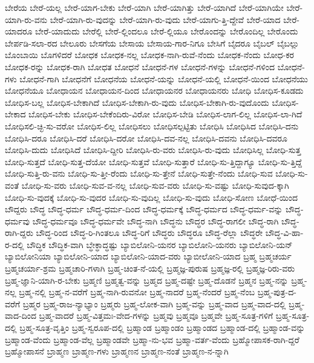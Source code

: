 {ಬೇರೆಯ
ಬೇರೆ-ಯಲ್ಲ
ಬೇರೆ-ಯಾಗ-ಬೇಕು
ಬೇರೆ-ಯಾಗಿ
ಬೇರೆ-ಯಾಗಿತ್ತು
ಬೇರೆ-ಯಾಗಿದೆ
ಬೇರೆ-ಯಾಗಿಯೇ
ಬೇರೆ-ಯಾಗಿ-ರು-ವನು
ಬೇರೆ-ಯಾಗಿ-ರು-ವುದನ್ನು
ಬೇರೆ-ಯಾಗಿ-ರು-ವುದು
ಬೇರೆ-ಯಾಗು-ತ್ತಿ-ದ್ದೇವೆ
ಬೇರೆ-ಯಾದ
ಬೇರೆ-ಯಾದರೂ
ಬೇರೆ-ಯಾದುದು
ಬೇರೆಲ್ಲಿ
ಬೇರೆ-ಲ್ಲಿಂದಲೂ
ಬೇರೆ-ಲ್ಲಿಯೂ
ಬೇರೊಂದನ್ನು
ಬೇರೊಂದಿಲ್ಲ
ಬೇರೊಂದು
ಬೇರ್ಪಡಿ-ಸಲಾ-ರದ
ಬೇಲೂರು
ಬೇಸಗೆಯ
ಬೇಸಾಯ
ಬೇಸಾಯ-ಗಾರ-ನಿಗೂ
ಬೇಸಿಗೆ
ಬೈದರೂ
ಬೈಬಲ್
ಬೈಬಲ್ಲು
ಬೊಂಬಾಯಿ
ಬೊಗಳಿದರೆ
ಬೋಧಕ
ಬೋಧಕ-ನಲ್ಲ
ಬೋಧಕ-ನಾಗಿ-ರುವೆ-ನೆಂದು
ಬೋಧಕ-ನೆಂದು
ಬೋಧ-ಕರ
ಬೋಧಕ-ರನ್ನು
ಬೋಧಕ-ರಾಗಿ
ಬೋಧತ
ಬೋಧನೆ
ಬೋಧನೆ-ಗಳ
ಬೋಧನೆ-ಗಳನ್ನು
ಬೋಧನೆ-ಗಳಿಂದ
ಬೋಧನೆ-ಗಳು
ಬೋಧನೆ-ಗಾಗಿ
ಬೋಧನೆಗೆ
ಬೋಧನೆಯ
ಬೋಧನೆ-ಯನ್ನು
ಬೋಧನೆ-ಯಲ್ಲಿ
ಬೋಧನೆ-ಯಿಂದ
ಬೋಧನೆಯು
ಬೋಧನೆಯೂ
ಬೋಧಾಯನ
ಬೋಧಾಯನ-ದಿಂದ
ಬೋಧಾಯನರ
ಬೋಧಾಯನರು
ಬೋಧಿ
ಬೋಧಿಸ-ಕೂಡದು
ಬೋಧಿಸ-ಬಲ್ಲ
ಬೋಧಿಸ-ಬೇಕಾಗಿದೆ
ಬೋಧಿಸ-ಬೇಕಾಗಿ-ರು-ವುದು
ಬೋಧಿಸ-ಬೇಕಾಗಿ-ರು-ವುದೊಂದು
ಬೋಧಿಸ-ಬೇಕಾದ
ಬೋಧಿಸ-ಬೇಕು
ಬೋಧಿಸ-ಬೇಕೆಂದಿರು-ವಿರೋ
ಬೋಧಿಸ-ಬೇಡಿ
ಬೋಧಿಸ-ಲಾಗ-ಲಿಲ್ಲ
ಬೋಧಿಸ-ಲಾ-ಗಿದೆ
ಬೋಧಿಸಲಿ-ಚ್ಛಿ-ಸು-ವರೋ
ಬೋಧಿಸ-ಲಿಲ್ಲ
ಬೋಧಿಸಲು
ಬೋಧಿಸಲ್ಪಟ್ಟಿತು
ಬೋಧಿಸಿ
ಬೋಧಿಸಿದ
ಬೋಧಿಸಿ-ದನು
ಬೋಧಿಸಿ-ದರೂ
ಬೋಧಿಸಿ-ದರೆ
ಬೋಧಿಸಿ-ದರೋ
ಬೋಧಿಸಿ-ದವ-ನಲ್ಲ
ಬೋಧಿಸಿ-ದವನು
ಬೋಧಿಸಿ-ದವರೂ
ಬೋಧಿಸಿ-ದುದು
ಬೋಧಿಸಿದೆ
ಬೋಧಿಸಿ-ದ್ದೀರಿ
ಬೋಧಿಸಿ-ರು-ವರು
ಬೋಧಿಸಿ-ರು-ವುದು
ಬೋಧಿಸಿಲ್ಲ
ಬೋಧಿ-ಸುತ್ತ
ಬೋಧಿ-ಸುತ್ತದೆ
ಬೋಧಿ-ಸುತ್ತ-ದೆಯೋ
ಬೋಧಿ-ಸುತ್ತವೆ
ಬೋಧಿ-ಸುತ್ತಾರೆ
ಬೋಧಿ-ಸು-ತ್ತಿದ್ದಾಗ್ಯೂ
ಬೋಧಿ-ಸು-ತ್ತಿದ್ದೆ
ಬೋಧಿ-ಸುತ್ತಿ-ರು-ವನು
ಬೋಧಿ-ಸು-ತ್ತೀ-ರೆಂದು
ಬೋಧಿ-ಸು-ತ್ತೇನೆ
ಬೋಧಿ-ಸುತ್ತೇ-ನೆಂದು
ಬೋಧಿ-ಸುವ
ಬೋಧಿ-ಸು-ವಂತೆ
ಬೋಧಿ-ಸು-ವರು
ಬೋಧಿ-ಸುವ-ವ-ನಲ್ಲ
ಬೋಧಿ-ಸುವ-ವರು
ಬೋಧಿ-ಸು-ವಷ್ಟು
ಬೋಧಿ-ಸುವುದ-ಕ್ಕಾಗಿ
ಬೋಧಿ-ಸು-ವುದಕ್ಕೆ
ಬೋಧಿ-ಸು-ವುದರ
ಬೋಧಿ-ಸು-ವುದಿಲ್ಲ
ಬೋಧಿ-ಸು-ವುದು
ಬೋಧಿ-ಸೋಣ
ಬೋಧೆ-ಯಿಂದ
ಬೌದ್ದರು
ಬೌದ್ಧ
ಬೌದ್ಧ-ಧರ್ಮ
ಬೌದ್ಧ-ಧರ್ಮ-ದಿಂದ
ಬೌದ್ಧ-ಧರ್ಮಕ್ಕೆ
ಬೌದ್ಧ-ಧರ್ಮದ
ಬೌದ್ಧ-ಧರ್ಮ-ವನ್ನು
ಬೌದ್ಧ-ಧರ್ಮವು
ಬೌದ್ಧ-ಧರ್ಮವೂ
ಬೌದ್ಧ-ಧರ್ಮವೇ
ಬೌದ್ಧ-ನಾಗಿ
ಬೌದ್ಧನು
ಬೌದ್ಧರ
ಬೌದ್ಧ-ರಾಗಲೀ
ಬೌದ್ಧ-ರಾಗಿ
ಬೌದ್ಧ-ರಾಗಿ-ದ್ದರು
ಬೌದ್ಧ-ರಿಂದ
ಬೌದ್ಧ-ರಿ-ಗಿಂತಲೂ
ಬೌದ್ಧ-ರಿಗೆ
ಬೌದ್ಧರು
ಬೌದ್ಧರೂ
ಬೌದ್ಧ-ರೆಲ್ಲಾ
ಬೌದ್ಧರೇ
ಬೌದ್ಧ-ವಿ-ಹಾ-ರ-ದಲ್ಲಿ
ಬೌದ್ಧಿಕ
ಬೌದ್ಧಿಕ-ವಾಗಿ
ಬ್ಧೇಕ್ಧಾದ್ಧಷ್ಟು
ಬ್ಯಾಬಿಲೋನಿ-ಯನರ
ಬ್ಯಾಬಿಲೋನಿ-ಯನರು
ಬ್ಯಾಬಿಲೋನಿ-ಯನ್
ಬ್ಯಾಬಿಲೋನಿಯಾ
ಬ್ಯಾಬಿಲೋನಿ-ಯಾದ
ಬ್ಯಾಬಿಲೋನಿ-ಯಾದ-ವರು
ಬ್ಯಾಬೀಲೋನಿ-ಯಾದ
ಬ್ರಹ್ಮ
ಬ್ರಹ್ಮಚರ್ಯ
ಬ್ರಹ್ಮಚರ್ಯಾ-ಶ್ರಮ
ಬ್ರಹ್ಮಚಾರಿ-ಗಳಾಗಿ
ಬ್ರಹ್ಮ-ಚಿಂತ-ನೆ-ಯಲ್ಲಿ
ಬ್ರಹ್ಮಜ್ಞ-ಪುರುಷ
ಬ್ರಹ್ಮಜ್ಞ-ರಲ್ಲಿ
ಬ್ರಹ್ಮಜ್ಞ-ರಿರು-ವರು
ಬ್ರಹ್ಮ-ಜ್ಞಾನಿ-ಯಾಗಿ-ರ-ಬೇಕು
ಬ್ರಹ್ಮಣಿ
ಬ್ರಹ್ಮತ್ವ-ವನ್ನು
ಬ್ರಹ್ಮದ
ಬ್ರಹ್ಮ-ದಷ್ಟೇ
ಬ್ರಹ್ಮ-ದೊಡನೆ
ಬ್ರಹ್ಮನ
ಬ್ರಹ್ಮ-ನನ್ನು
ಬ್ರಹ್ಮ-ನಲ್ಲ
ಬ್ರಹ್ಮ-ನಲ್ಲಿ
ಬ್ರಹ್ಮ-ನ-ವರೆಗೆ
ಬ್ರಹ್ಮ-ನಾಗಿ-ರುವನೋ
ಬ್ರಹ್ಮ-ನಾದರೆ
ಬ್ರಹ್ಮ-ನೆಂದರೆ
ಬ್ರಹ್ಮ-ನೆಂಬ
ಬ್ರಹ್ಮ-ಪುತ್ರ-ದ-ವರೆಗೆ
ಬ್ರಹ್ಮರ
ಬ್ರಹ್ಮ-ರಾಜ-ನ್ಯಾಭ್ಯಾಂ
ಬ್ರಹ್ಮರು
ಬ್ರಹ್ಮ-ಲೋಕ-ವಾಗಿ
ಬ್ರಹ್ಮ-ವನ್ನು
ಬ್ರಹ್ಮ-ವಾದ
ಬ್ರಹ್ಮ-ವಾದ-ದಲ್ಲಿ
ಬ್ರಹ್ಮ-ವಾದ-ದಿಂದ
ಬ್ರಹ್ಮ-ವಾದರೆ
ಬ್ರಹ್ಮ-ವಿತ್ತಮಃ-ವೇದ-ಗಳನ್ನು
ಬ್ರಹ್ಮವು
ಬ್ರಹ್ಮವೂ
ಬ್ರಹ್ಮವೇ
ಬ್ರಹ್ಮ-ಸೂತ್ರ-ಗಳಿಗೆ
ಬ್ರಹ್ಮ-ಸೂತ್ರ-ದಲ್ಲಿ
ಬ್ರಹ್ಮ-ಸೂತ್ರ-ವೃತ್ತಿಂ
ಬ್ರಹ್ಮ-ಸ್ವರೂಪ-ದಲ್ಲಿ
ಬ್ರಹ್ಮಾಂಡ
ಬ್ರಹ್ಮಾಂಡಂ
ಬ್ರಹ್ಮಾಂಡದ
ಬ್ರಹ್ಮಾಂಡ-ದಲ್ಲಿ
ಬ್ರಹ್ಮಾಂಡ-ವನ್ನು
ಬ್ರಹ್ಮಾಂಡ-ವೆಂದು
ಬ್ರಹ್ಮಾಂಡ-ವೆಲ್ಲ
ಬ್ರಹ್ಮಾಂಡವೇ
ಬ್ರಹ್ಮಾ-ನು-ಭವ
ಬ್ರಹ್ಮಾ-ವರ್ತ-ವೆಂದು
ಬ್ರಹ್ಮೋಪಾಸಕ-ರಾಗಿ-ದ್ದರೆ
ಬ್ರಹ್ಮೋಪಾಸನೆ
ಬ್ರಾಹ್ಮಣ
ಬ್ರಾಹ್ಮಣ-ಗಳು
ಬ್ರಾಹ್ಮಣನ
ಬ್ರಾಹ್ಮಣ-ನಂತೆ
ಬ್ರಾಹ್ಮಣ-ನ-ನ್ನಾಗಿ
}
